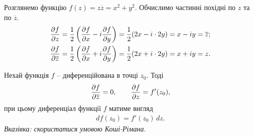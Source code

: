 \documentclass{math_library}
\begin{document}
\begin{example}
Розглянемо функцію $f(z) = z \overline{z} = x^2 + y^2$. Обчислимо частинні похідні по $z$ та по $\overline{z}$.
\begin{align*}
\dfrac{\partial {f}}{\partial {z}} = \dfrac{1}{2} \left( \dfrac{\partial {f}}{\partial {x}} - i \dfrac{\partial {f}}{\partial {y}} \right) = \dfrac{1}{2} (2x - i \cdot 2y) = x-iy = \overline{z}; \\
\dfrac{\partial {f}}{\partial {\overline{z}}} = \dfrac{1}{2} \left( \dfrac{\partial {f}}{\partial {x}} + i \dfrac{\partial {f}}{\partial {y}} \right) = \dfrac{1}{2} (2x + i \cdot 2y) = x+iy = z.
\end{align*}
\end{example}

\begin{theorem}
Нехай функція $f$ -- диференційована в точці $z_0$. Тоді
\begin{align*}
\dfrac{\partial {f}}{\partial {\overline{z}}} = 0, \qquad \dfrac{\partial {f}}{\partial {z}} = f'(z_0),
\end{align*}
при цьому диференціал функції $f$ матиме вигляд
\begin{align*}
df(z_0) = f'(z_0)\,dz.
\end{align*}
\textit{Вказівка: скористатися умовою Коші-Рімана}.
\end{theorem}

\iffalse
\end{document}
